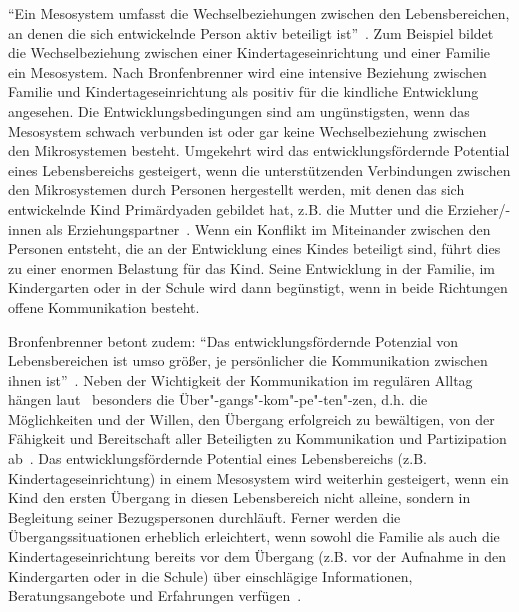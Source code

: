 \documentclass[12pt,a4paper]{article}
\begin{document}
	"`Ein Mesosystem umfasst die Wechselbeziehungen zwischen den Lebensbereichen, an denen die sich entwickelnde Person aktiv beteiligt ist"'~\parencite[S.~41]{Bronfenbrenner}. Zum Beispiel bildet die Wechselbeziehung zwischen einer Kindertageseinrichtung und einer Familie ein Mesosystem. Nach Bronfenbrenner wird eine intensive Beziehung zwischen Familie und Kindertageseinrichtung als positiv für die kindliche Entwicklung angesehen. Die Entwicklungsbedingungen sind am ungünstigsten, wenn das Mesosystem schwach verbunden ist oder gar keine Wechselbeziehung zwischen den Mikrosystemen besteht. Umgekehrt wird das entwicklungsfördernde Potential eines Lebensbereichs gesteigert, wenn die unterstützenden Verbindungen zwischen den Mikrosystemen durch Personen hergestellt werden, mit denen das sich entwickelnde Kind Primärdyaden gebildet hat, z.B. die Mutter und die Erzieher/-innen als Erziehungspartner~\parencite[S.~205]{Bronfenbrenner}. Wenn ein Konflikt im Miteinander zwischen den Personen entsteht, die an der Entwicklung eines Kindes beteiligt sind, führt dies zu einer enormen Belastung für das Kind. Seine Entwicklung in der Familie, im Kindergarten oder in der Schule wird dann begünstigt, wenn in beide Richtungen offene Kommunikation besteht. 
	
Bronfenbrenner betont zudem: "`Das entwicklungsfördernde Potenzial von Lebensbereichen ist umso größer, je persönlicher die Kommunikation zwischen ihnen ist"'~\parencite[S.~207]{Bronfenbrenner}. Neben der Wichtigkeit der Kommunikation im regulären Alltag hängen laut~\textcite{Griebel} besonders die Über"-gangs"-kom"-pe"-ten"-zen, d.h. die Möglichkeiten und der Willen, den Übergang erfolgreich zu bewältigen, von der Fähigkeit und Bereitschaft aller Beteiligten zu Kommunikation und Partizipation ab~\parencite[S.~4]{Griebel}. Das entwicklungsfördernde Potential eines Lebensbereichs (z.B. Kindertageseinrichtung) in einem Mesosystem wird weiterhin gesteigert, wenn ein Kind den ersten Übergang in diesen Lebensbereich nicht alleine, sondern in Begleitung seiner Bezugspersonen durchläuft. Ferner werden die Übergangssituationen erheblich erleichtert, wenn sowohl die Familie als auch die Kindertageseinrichtung bereits vor dem Übergang  (z.B. vor der Aufnahme in den Kindergarten oder in die Schule) über einschlägige Informationen, Beratungsangebote und Erfahrungen verfügen~\parencite[S.~208]{Bronfenbrenner}.
\end{document}
